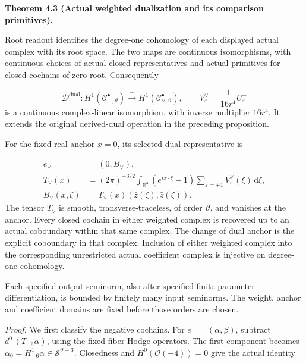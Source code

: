 \documentclass[
  english,
  11pt,
  reqno]{amsart}
\makeatletter
\newcommand{\pandocstatementheading}[1]{%
  \par\addpenalty{\@beginparpenalty}%
  \addvspace{.5\baselineskip plus .2\baselineskip minus .2\baselineskip}%
  {\normalfont\bfseries #1\par}%
  \nobreak\@afterindenttrue\@afterheading
}
\makeatother
\begin{document}
\pandocstatementheading{\leavevmode{}\label{thm:online-actual-weighted-negative-dual}Theorem 4.3 (Actual weighted dualization and its comparison primitives).}

Root readout identifies the degree-one cohomology of each displayed
actual complex with its root space. The two maps are continuous
isomorphisms, with continuous choices of actual closed representatives
and actual primitives for closed cochains of zero root. Consequently

\label{eq:online-actual-negative-dual-isomorphism} \[
\mathcal D_-^{\mathrm{dual}}:
H^1(\mathscr C_{-,\vartheta}^{\bullet})
\xrightarrow{\ \sim\ }
H^1(\mathscr C_{\vee,\vartheta}^{\bullet}),
\qquad
V^\vee_\varepsilon=\frac1{16r^4}U^-_\varepsilon
\] is a continuous complex-linear isomorphism, with inverse multiplier
\(16r^4\). It extends the original derived-dual operation in the
preceding proposition.

For the fixed real anchor \(x=0\), its selected dual representative is

\label{eq:online-actual-dual-anchored-representative} \[
\begin{aligned}
e_\vee&=(0,B_\vee),\\
T_\vee(x)
&=(2\pi)^{-3/2}\int_{\mathbb R^3}
 (e^{ix\cdot\xi}-1)
 \sum_{\varepsilon=\pm1}V^\vee_\varepsilon(\xi)
 \,\mathrm d\xi,\\
B_\vee(x,\zeta)&=T_\vee(x)(\bar z(\zeta),\bar z(\zeta)).
\end{aligned}
\] The tensor \(T_\vee\) is smooth, transverse-traceless, of order
\(\vartheta\), and vanishes at the anchor. Every closed cochain in
either weighted complex is recovered up to an actual coboundary within
that same complex. The change of dual anchor is the explicit coboundary
in that complex. Inclusion of either weighted complex into the
corresponding unrestricted actual coefficient complex is injective on
degree-one cohomology.

Each specified output seminorm, also after specified finite parameter
differentiation, is bounded by finitely many input seminorms. The
weight, anchor and coefficient domains are fixed before those orders are
chosen.

\emph{Proof.} We first classify the negative cochains. For
\(e_-=(\alpha,\beta)\), subtract \(d_-^0(T_{-6}\alpha)\), using
\hyperref[eq:online-root-fiber-homotopy]{the fixed fiber Hodge
operators}. The first component becomes
\(\alpha_0=H^1_{-6}\alpha\in\mathscr S^{\vartheta-3}\). Closedness and
\(H^0(\mathcal O(-4))=0\) give the actual identity
\end{document}
